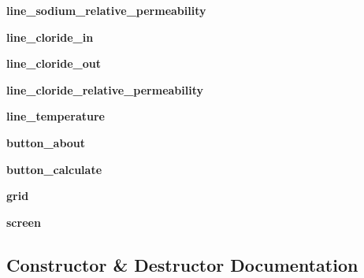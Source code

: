 \begin{DoxyCompactItemize}
{\bfseries line\+\_\+sodium\+\_\+relative\+\_\+permeability}
\item 
\mbox{\label{classgoldman__app_1_1GoldmanEquationWidget_a4d2fbf0d014dcb80f94b35f4932e787d}} 
{\bfseries line\+\_\+cloride\+\_\+in}
\item 
\mbox{\label{classgoldman__app_1_1GoldmanEquationWidget_ad9969b61370d676bd84df0a47d45a5ea}} 
{\bfseries line\+\_\+cloride\+\_\+out}
\item 
\mbox{\label{classgoldman__app_1_1GoldmanEquationWidget_a60b4f38fda2049e0b655e430f59d56a8}} 
{\bfseries line\+\_\+cloride\+\_\+relative\+\_\+permeability}
\item 
\mbox{\label{classgoldman__app_1_1GoldmanEquationWidget_a9debd9be5fb5a26361739dc4325ad64d}} 
{\bfseries line\+\_\+temperature}
\item 
\mbox{\label{classgoldman__app_1_1GoldmanEquationWidget_a57d1c1f4dcec3bd14a87f649899203f7}} 
{\bfseries button\+\_\+about}
\item 
\mbox{\label{classgoldman__app_1_1GoldmanEquationWidget_a5a015393375ea68a16cf915aac4c6555}} 
{\bfseries button\+\_\+calculate}
\item 
\mbox{\label{classgoldman__app_1_1GoldmanEquationWidget_a11239a24f803f6fb1e41740e85acf709}} 
{\bfseries grid}
\item 
\mbox{\label{classgoldman__app_1_1GoldmanEquationWidget_a751fdf6f96396698dffa795144698ab7}} 
{\bfseries screen}
\end{DoxyCompactItemize}


\subsection{Constructor \& Destructor Documentation}
\mbox{\label{classgoldman__app_1_1GoldmanEquationWidget_aaec0bd4e16059c3660efe4984126a075}} 
